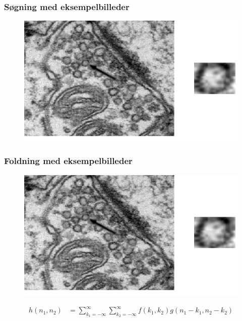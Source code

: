 \begin{frame}
\frametitle{Søgning med eksempelbilleder}
\begin{figure}[H]
	\centering
	\includegraphics[scale=0.4]{img/finalmethod/cell2.png}
\end{figure}
\end{frame}

\begin{frame}
\frametitle{Foldning med eksempelbilleder}
\begin{figure}[H]
	\centering
	\includegraphics[scale=0.4]{img/finalmethod/cell2.png}
\end{figure}

\begin{align*}
h(n_1,n_2) &= \sum_{k_1=-\infty}^{\infty} \sum_{k_2=-\infty}^{\infty} f(k_1,k_2)g(n_1-k_1,n_2-k_2)
\end{align*}

\end{frame}


